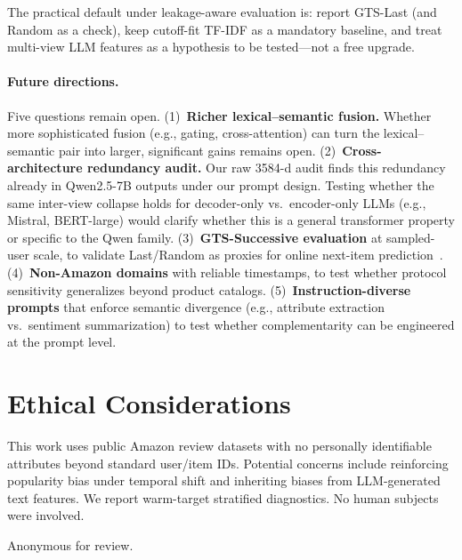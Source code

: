 \documentclass[sigconf,natbib=true,anonymous]{acmart}
\newcommand{\tfidf}{\textsc{TF-IDF}\xspace}
\begin{document}
The practical default under leakage-aware evaluation is: report GTS-Last (and Random as a check), keep cutoff-fit \tfidf as a mandatory baseline, and treat multi-view LLM features as a hypothesis to be tested---not a free upgrade.

\paragraph{Future directions.}
Five questions remain open.
(1)~\textbf{Richer lexical--semantic fusion.}  Whether more sophisticated fusion (e.g., gating, cross-attention) can turn the lexical--semantic pair into larger, significant gains remains open.
(2)~\textbf{Cross-architecture redundancy audit.}  Our raw 3584-d audit finds this redundancy already in Qwen2.5-7B outputs under our prompt design.  Testing whether the same inter-view collapse holds for decoder-only vs.\ encoder-only LLMs (e.g., Mistral, BERT-\hspace{0pt}large) would clarify whether this is a general transformer property or specific to the Qwen family.
(3)~\textbf{GTS-Successive evaluation} at sampled-user scale, to validate Last/Random as proxies for online next-item prediction~\cite{gusak2025time}.
(4)~\textbf{Non-Amazon domains} with reliable timestamps, to test whether protocol sensitivity generalizes beyond product catalogs.
(5)~\textbf{Instruction-diverse prompts} that enforce semantic divergence (e.g., attribute extraction vs.\ sentiment summarization) to test whether complementarity can be engineered at the prompt level.

\section*{Ethical Considerations}
This work uses public Amazon review datasets with no personally identifiable attributes beyond standard user/item IDs.
Potential concerns include reinforcing popularity bias under temporal shift and inheriting biases from LLM-generated text features.
We report warm-target stratified diagnostics.
No human subjects were involved.

\begin{acks}
Anonymous for review.
\end{acks}

\appendix
\renewcommand{\arraystretch}{0.88}
\setlength{\abovecaptionskip}{4pt}
\setlength{\belowcaptionskip}{2pt}
\end{document}
